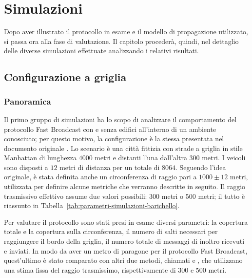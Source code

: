 
\chapter{Simulazioni}\label{chap:simulazioni}
Dopo aver illustrato il protocollo in esame e il modello di propagazione utilizzato, si passa ora alla fase di valutazione.
Il capitolo procederà, quindi, nel dettaglio delle diverse simulazioni effettuate analizzando i relativi risultati.
%
\section{Configurazione a griglia}
\subsection{Panoramica}
Il primo gruppo di simulazioni ha lo scopo di analizzare il comportamento del protocollo Fast Broadcast con e senza edifici all'interno
di un ambiente conosciuto;
per questo motivo, la configurazione è la stessa presentata nel documento originale \cite{Barichello2017propagazione}.
Lo scenario è una città fittizia con strade a griglia in stile Manhattan di lunghezza $4000$ metri e distanti l'una dall'altra $300$ metri.
I veicoli sono disposti a $12$ metri di distanza per un totale di $8064$.
Seguendo l'idea originale, è stata definita anche un circonferenza di raggio pari a $1000\pm12$ metri, utilizzata per definire alcune metriche che verranno descritte in seguito.
Il raggio trasmissivo effettivo assume due valori possibili: $300$ metri o $500$ metri;
il tutto è riassunto in Tabella~\ref{tab:parametri-simulazioni-barichello}.

Per valutare il protocollo sono stati presi in esame diversi parametri: la copertura totale e la copertura sulla circonferenza,
il numero di salti necessari per raggiungere il bordo della griglia, il numero totale di messaggi di inoltro ricevuti e inviati.
In modo da aver un metro di paragone per il protocollo Fast Broadcast, quest'ultimo è stato comparato con altri due metodi, chiamati \statica e \staticb,
che utilizzano una stima fissa del raggio trasmissimo, rispettivamente di $300$ e $500$ metri.

